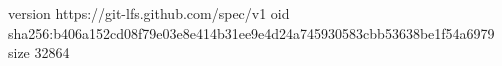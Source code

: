 version https://git-lfs.github.com/spec/v1
oid sha256:b406a152cd08f79e03e8e414b31ee9e4d24a745930583cbb53638be1f54a6979
size 32864
